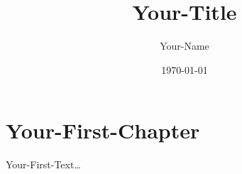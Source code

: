 \documentclass[11pt]{article}
\author{Your-Name}
\date{\today}
\title{Your-Title}
\begin{document}
\maketitle
\tableofcontents

\newpage
\section{Your-First-Chapter}
\label{sec:orga19a80f}

Your-First-Text\ldots{}
\end{document}
